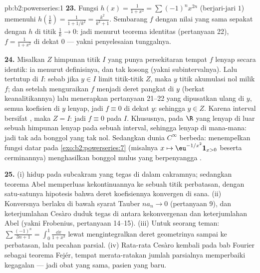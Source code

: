 \begin{solution}{pb:b2:powerseries:1}
\textbf{23.} Fungsi $h(x) = \frac{1}{1+x^2} =
\sum(-1)^nx^{2n}$ (berjari-jari $1$) memenuhi $h(\frac1k) =
\frac{1}{1 + 1/k^2} = \frac{k^2}{k^2+1}$. Sembarang $f$  dengan
nilai yang sama sepakat dengan $h$ di titik $\frac1k \to 0$:
jadi menurut teorema identitas (pertanyaan 22), $f = \frac{1}{1+x^2}$
di dekat $0$ --- yakni penyelesaian tunggalnya.

\textbf{24.} Misalkan $Z$ himpunan titik $I$ yang punya
persekitaran tempat $f$ lenyap secara identik: ia  menurut
definisinya, dan tak kosong (yakni subintervalnya). Lalu tertutup di $I$:
sebab jika $y \in I$ limit titik-titik $Z$, maka $y$ titik akumulasi
nol milik $f$; dan setelah menguraikan $f$ menjadi deret pangkat di $y$
(berkat keanalitikannya) lalu menerapkan pertanyaan 21--22 yang dipusatkan
ulang di $y$, semua koefisien di $y$ lenyap, jadi $f \equiv 0$ di dekat $y$:
sehingga $y \in Z$. Karena interval bersifat , maka $Z = I$:
jadi $f \equiv 0$ pada $I$. Khususnya,  pada $\R$ yang
lenyap di luar sebuah himpunan  lenyap pada sebuah interval,
sehingga lenyap di mana-mana: jadi tak ada bonggol  yang tak nol.
Sedangkan dunia $C^\infty$ berbeda: menempelkan fungsi datar pada
\cref{exo:b2:powerseries:7} (misalnya $x \mapsto
\eu^{-1/x^2}\mathbf 1_{x>0}$ beserta cerminannya) menghasilkan bonggol
mulus yang berpenyangga .

\textbf{25.} (i)  hidup pada subcakram 
yang tegas di dalam cakramnya; sedangkan teorema Abel memperluas
kekontinuannya ke sebuah titik perbatasan, dengan satu-satunya hipotesis
bahwa deret koefisiennya konvergen di sana. (ii) Konversnya berlaku
di bawah syarat Tauber $na_n \to 0$ (pertanyaan 9), dan
keterjumlahan Cesàro duduk tegas di antara kekonvergenan dan
keterjumlahan Abel (yakni Frobenius, pertanyaan 14--15). (iii) Untuk
seorang teman: $\sum\frac{(-1)^n}{3n+1} = \int_0^1\frac{\dd x}{1+x^3}$
lewat mengintegralkan deret geometrinya sampai ke perbatasan, lalu
pecahan parsial. (iv) Rata-rata Cesàro kembali pada bab Fourier
sebagai teorema Fejér, tempat merata-ratakan jumlah parsialnya
memperbaiki kegagalan  --- jadi obat yang
sama, pasien yang baru.

\end{solution}
